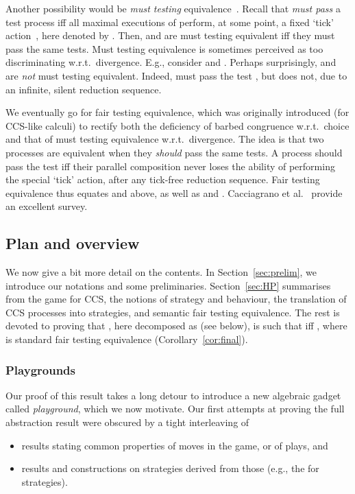 \documentclass{LMCS}
\theoremstyle{plain}\newtheorem{satz}[thm]{Satz}
\begin{document}
Another possibility would be \emph{must testing}
equivalence~\cite{DBLP:journals/tcs/NicolaH84}.  Recall that 
\emph{must pass} a test process  iff all maximal executions of
 perform, at some point, a fixed `tick'
action~\cite{DBLP:journals/iandc/Gorla10}, here denoted by .
Then,  and  are must testing equivalent iff they must
pass the same tests.  Must testing equivalence is sometimes perceived
as too discriminating w.r.t.\ divergence.  E.g., consider  and . Perhaps surprisingly,  and 
are \emph{not} must testing equivalent. Indeed,  must pass the
test , but  does not, due to an infinite, silent
reduction sequence.

We eventually go for fair testing equivalence, which was originally
introduced (for CCS-like calculi) to rectify both the deficiency of
barbed congruence w.r.t.\ choice and that of must testing equivalence
w.r.t.\ divergence.  The idea is that two processes are equivalent
when they \emph{should} pass the same tests. A process 
should pass the test  iff their parallel composition 
never loses the ability of performing the special `tick' action, after
any tick-free reduction sequence. Fair testing equivalence thus
equates  and  above, as well as  and .
Cacciagrano et al.~\cite{DBLP:journals/corr/abs-0904-2340} provide an
excellent survey.


\subsection{Plan and overview}\label{subsec:overview}
We now give a bit more detail on the contents.  In
Section~\ref{sec:prelim}, we introduce our notations and some
preliminaries.  Section~\ref{sec:HP} summarises from  the game for
CCS, the notions of strategy and behaviour, the translation
 of CCS processes into strategies, and semantic fair
testing equivalence.  The rest is devoted to proving that
, here decomposed as  (see
below), is such that  iff , where  is standard fair testing
equivalence (Corollary~\ref{cor:final}).

\subsubsection{Playgrounds}
Our proof of this result takes a long detour to introduce a new
algebraic gadget called \emph{playground}, which we now motivate.  Our
first attempts at proving the full abstraction result were obscured by
a tight interleaving of
\begin{itemize}
\item results stating common properties of moves in the game, or of
  plays, and
\item results and constructions on strategies derived from those
  (e.g., the \lts{} for strategies).
\end{itemize}
\end{document}
